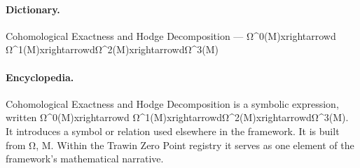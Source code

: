 \paragraph{Dictionary.}
Cohomological Exactness and Hodge Decomposition — Ω\textasciicircum{}0(M)xrightarrowd Ω\textasciicircum{}1(M)xrightarrowdΩ\textasciicircum{}2(M)xrightarrowdΩ\textasciicircum{}3(M)

\paragraph{Encyclopedia.}
Cohomological Exactness and Hodge Decomposition is a symbolic expression, written Ω\textasciicircum{}0(M)xrightarrowd Ω\textasciicircum{}1(M)xrightarrowdΩ\textasciicircum{}2(M)xrightarrowdΩ\textasciicircum{}3(M). It introduces a symbol or relation used elsewhere in the framework. It is built from Ω, M. Within the Trawin Zero Point registry it serves as one element of the framework's mathematical narrative.

